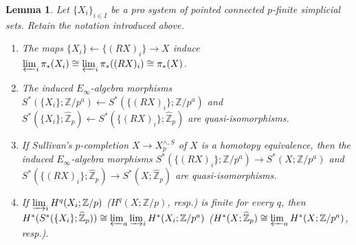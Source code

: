 \documentclass[11pt]{amsart}
\newtheorem{lemma}[theorem]{Lemma}
\theoremstyle{definition}
\numberwithin{equation}{section}
\numberwithin{equation}{section}
\newcommand\ZZ{\mathbb{Z}}
\begin{document}
\begin{lemma}\label{Lem: quasi-isomorphisms between homotopy limit and the pro space}
Let $\{X_i\}_{i\in I}$ be a pro system of pointed connected $p$-finite simplicial sets.
Retain the notation introduced above.
\begin{enumerate}[leftmargin=0.25in]
    \item The maps $\{X_i\}\leftarrow \{(RX)_i\}\rightarrow X$ induce $\varprojlim_i \pi_*(X_i)\cong  \varprojlim_i \pi_*((RX)_i)\cong \pi_*(X)$.
    \item The induced $E_{\infty}$-algebra morphisms  $S^*(\{X_i\};\ZZ/p^a)\leftarrow S^*(\{(RX)_i\};\ZZ/p^a)$ and  $S^*(\{X_i\};\widehat{\ZZ}_p)\leftarrow S^*(\{(RX)_i\};\widehat{\ZZ}_p)$ are quasi-isomorphisms.
    \item If Sullivan's $p$-completion $X\rightarrow X^{\wedge,S}_p$ of $X$ is a homotopy equivalence, then the induced $E_{\infty}$-algebra morphisms $S^*(\{(RX)_i\};\ZZ/p^a)\rightarrow S^*(X;\ZZ/p^a)$ and $S^*(\{(RX)_i\};\widehat{\ZZ}_p)\rightarrow S^*(X;\widehat{\ZZ}_p)$ are quasi-isomorphisms.
    \item If $\varinjlim_i H^q(X_i;\ZZ/p)$ ($H^q(X;\ZZ/p)$, resp.) is finite for every $q$, then $H^*(S^*(\{X_i\};\widehat{\ZZ}_p))\cong \varprojlim_{a}\varinjlim_i H^*(X_i;\ZZ/p^a)$ ($H^*(X;\widehat{\ZZ}_p)\cong\varprojlim_{a} H^*(X;\ZZ/p^a)$, resp.).
\end{enumerate}
\end{lemma}
\end{document}
